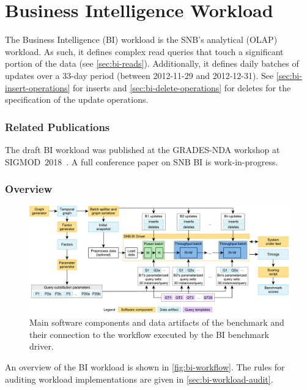 \chapter{Business Intelligence Workload}
\label{sec:bi}

The Business Intelligence (BI) workload is the SNB's analytical (OLAP) workload.
As such, it defines complex read queries that touch a significant portion of the data (see \autoref{sec:bi-reads}).
Additionally, it defines daily batches of updates over a 33-day period (between 2012-11-29 and 2012-12-31).
See
\autoref{sec:bi-insert-operations} for inserts and
\autoref{sec:bi-delete-operations} for deletes for the specification of the update operations.



\subsection*{Related Publications}

The draft BI workload was published at the \mbox{GRADES-NDA} workshop at \mbox{SIGMOD 2018}~\cite{DBLP:conf/grades/SzarnyasPAMPKEB18}.
A full conference paper on SNB BI is work-in-progress.


\subsection{Overview}
\label{sec:bi-benchmark-overview}

\begin{figure}[H]
    \centering
    \includegraphics[scale=\yedscale]{figures/bi-workflow}
    \caption{Main software components and data artifacts of the benchmark and their connection to the workflow executed by the BI benchmark driver.}
    \label{fig:bi-workflow}
\end{figure}

An overview of the BI workload is shown in \autoref{fig:bi-workflow}.
The rules for auditing workload implementations are given in \autoref{sec:bi-workload-audit}.

